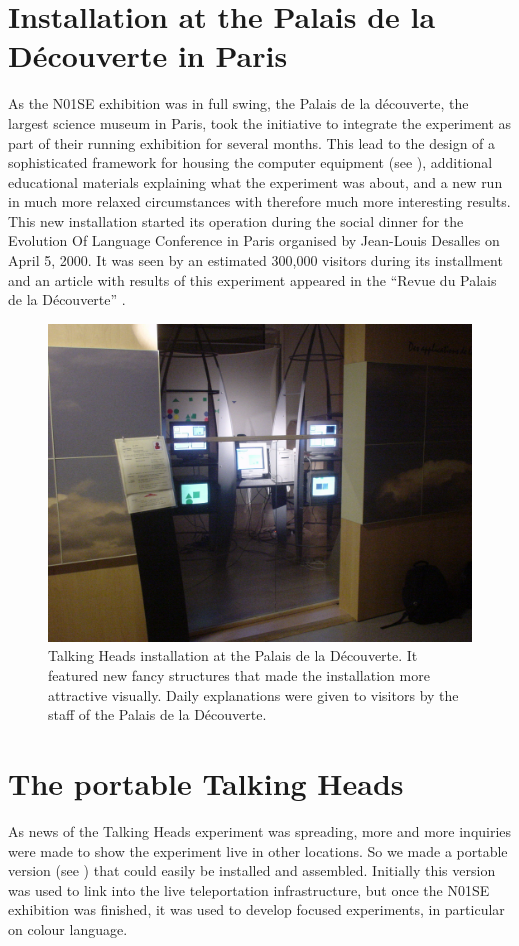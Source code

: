 \section{Installation at the Palais de la D\'{e}couverte in Paris}

As the N01SE exhibition was in full swing, the Palais de la d\'{e}couverte, the largest science museum in Paris, 
took the initiative to integrate the experiment as part of their running exhibition for several months. This lead 
to the design of a sophisticated framework for housing the computer equipment (see ), 
additional educational materials explaining
what the experiment was about, and a new run in much more relaxed circumstances with therefore much more 
interesting results. This new installation started its operation during the social 
dinner for the Evolution Of Language Conference in Paris organised by Jean-Louis Desalles
on April 5, 2000. It was seen by an estimated 300,000 visitors
during its installment and an article with results of this experiment
appeared in the ``Revue du Palais de la D\'{e}couverte'' \citep{Steels:2000kaplan}. 

\begin{figure}[htbp]
  \centerline{\includegraphics[width=.65\textwidth]{chap9/figs/th4.jpg}}
\caption{\label{fig:palais}Talking Heads installation at the Palais de la D\'{e}couverte. It featured new fancy structures that 
made the installation more attractive visually. Daily explanations were given to visitors 
by the staff of the Palais de la D\'{e}couverte.} 
\end{figure}

\section{The portable Talking Heads} 

As news of the Talking Heads experiment was spreading, more and more inquiries were made to 
show the experiment live in other locations. So we made a portable version (see ) that could easily 
be installed and assembled. Initially this version was used to link into the live 
teleportation infrastructure, but once the N01SE exhibition was finished, it was used to develop focused 
experiments, in particular on colour language. 


